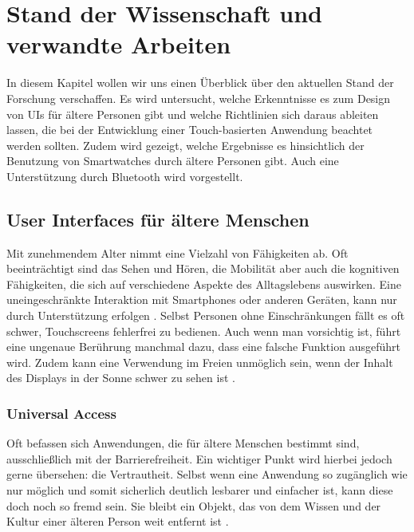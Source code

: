 \chapter{Stand der Wissenschaft und verwandte Arbeiten}

In diesem Kapitel wollen wir uns einen Überblick über den aktuellen Stand der Forschung verschaffen. Es wird untersucht, welche Erkenntnisse es zum Design von \acp{UI} für ältere Personen gibt und welche Richtlinien sich daraus ableiten lassen, die bei der Entwicklung einer Touch-basierten Anwendung beachtet werden sollten. Zudem wird gezeigt, welche Ergebnisse es hinsichtlich der Benutzung von Smartwatches durch ältere Personen gibt. Auch eine Unterstützung durch Bluetooth wird vorgestellt.

\section{User Interfaces für ältere Menschen}\label{sec:guidelines}

Mit zunehmendem Alter nimmt eine Vielzahl von Fähigkeiten ab. Oft beeinträchtigt sind das Sehen und Hören, die Mobilität aber auch die kognitiven Fähigkeiten, die sich auf verschiedene Aspekte des Alltagslebens auswirken. Eine uneingeschränkte Interaktion mit Smartphones oder anderen Geräten, kann nur durch Unterstützung erfolgen \cite{Almeida:2015:Recommendations-for-the-Development-of-Web-Interfaces}\cite{Diaz-Bossini:2014:Accessibility-to-Mobile-Interfaces}\cite{Huang:2016:Design-of-Smart-Watch}\cite{Salman:2018:Usability-Evaluation-of-the-Smartphone}\cite{Sin:2015:Evaluation-of-Wearable-Device}. Selbst Personen ohne Einschränkungen fällt es oft schwer, Touchscreens fehlerfrei zu bedienen. Auch wenn man vorsichtig ist, führt eine ungenaue Berührung manchmal dazu, dass eine falsche Funktion ausgeführt wird. Zudem kann eine Verwendung im Freien unmöglich sein, wenn der Inhalt des Displays in der Sonne schwer zu sehen ist \cite{Kivirinta:2013:The-Right-UI-for-Elderly-People;}.

\subsection{Universal Access}

Oft befassen sich Anwendungen, die für ältere Menschen bestimmt sind, ausschließlich mit der Barrierefreiheit. Ein wichtiger Punkt wird hierbei jedoch gerne übersehen: die Vertrautheit. Selbst wenn eine Anwendung so zugänglich wie nur möglich und somit sicherlich deutlich lesbarer und einfacher ist, kann diese doch noch so fremd sein. Sie bleibt ein Objekt, das von dem Wissen und der Kultur einer älteren Person weit entfernt ist \cite{Leonardi:2010:An-Exploratory-Study-of-a-Touch-Based}.


